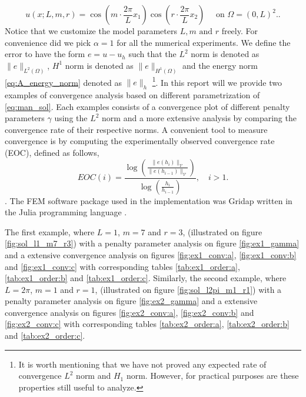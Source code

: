 \begin{equation}
    \label{eq:man_sol}
u\left( x; L,m,r \right) = \cos\left(  m\cdot \frac{2\pi}{L}  x_{1}\right)  \cos \left(r\cdot  \frac{2\pi}{L} x_{2} \right) \quad \text{ on }   \Omega =  \left( 0,L  \right)^{2}.
.\end{equation}
Notice that we customize the model parameters $L, m \text{ and } r$ freely.
For convenience did we pick $\alpha = 1$ for all the numerical experiments. We define the error to have the form $e = u - u_{h}$ such that the $L^2$ norm is denoted as $\| e \|_{ L^{2}\left( \Omega  \right)   }^{  } $, $H^{1} $ norm is denoted as $\|
e \|_{ H^{1}\left( \Omega  \right)  }^{  } $ and the energy norm  \eqref{eq:A_energy_norm} denoted as $\| e \|_{ h }^{  } $ \footnote{
It is worth mentioning that we have not proved any expected rate of convergence $L^2$ norm and $H_1$ norm. However, for practical purposes are these properties still useful to analyze.
}. In this report will we provide two examples of convergence analysis based on different
parametrization of \eqref{eq:man_sol}. Each examples consists of a convergence plot of different penalty parameters $\gamma$ using the $L^{2}$ norm and a more extensive analysis by comparing the convergence rate of their respective norms. A convenient tool to measure convergence is by computing the experimentally observed convergence rate (EOC), defined as follows,
\[
EOC(i) = \frac{\log\left( \frac{\| e\left( h_{i} \right)  \|_{ \mathcal{V}  }^{  }}{\| e\left( h_{i-1} \right) \|_{\mathcal{V}   }^{  } }   \right)}{\log\left( \frac{h_{i}}{h_{i-1}}  \right) }, \quad i>1   .
\].
The FEM software package used in the implementation was Gridap written in the Julia programming language \cite{verdugo22, julia17}.


The first example, where $L=1$, $m=7$ and $r=3$, (illustrated on figure \ref{fig:sol_l1_m7_r3}) with a penalty parameter analysis on figure \ref{fig:ex1_gamma} and a extensive convergence analysis on figures \ref{fig:ex1_conv:a}, \ref{fig:ex1_conv:b} and \ref{fig:ex1_conv:c} with
corresponding tables \ref{tab:ex1_order:a}, \ref{tab:ex1_order:b} and \ref{tab:ex1_order:c}. Similarly, the second example, where $L=2\pi$, $m=1$ and $r=1$, (illustrated on figure \ref{fig:sol_l2pi_m1_r1}) with a penalty parameter analysis on figure
\ref{fig:ex2_gamma} and a extensive convergence analysis on figures \ref{fig:ex2_conv:a},
\ref{fig:ex2_conv:b} and \ref{fig:ex2_conv:c} with corresponding tables \ref{tab:ex2_order:a}, \ref{tab:ex2_order:b} and \ref{tab:ex2_order:c}.

